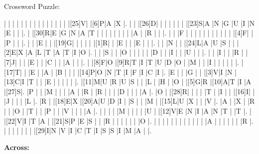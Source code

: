 \documentclass[12pt]{article}
\begin{document}
\begin{center}
  \huge{Crossword Puzzle:}
\end{center}
\vspace{1.5cm}
\begin{Puzzle}{21}{21}
  |{}  |{}  |{}  |{}  |{}  |{}  |{}  |{}  |{}  |{}  |{}  |{}  |{}  |{}  |{}  |[25]V|{}  |[6]P|A   |X   |.
  |{}  |{}  |[26]D|{}  |{}  |{}  |{}  |{}  |{}  |{}  |[23]S|A   |N   |G   |U   |I   |N   |E   |{}  |{}  |.
  |{}  |[30]R|E   |G   |N   |A   |T   |{}  |{}  |{}  |{}  |{}  |{}  |{}  |{}  |A   |{}  |R   |{}  |{}  |.
  |{}  |{}  |F   |{}  |{}  |{}  |{}  |{}  |{}  |{}  |{}  |{}  |{}  |{}  |[4]F|{}  |{}  |P   |{}  |{}  |.
  |{}  |{}  |E   |{}  |{}  |[19]G|{}  |{}  |{}  |{}  |{}  |[1]R|{}  |{}  |E   |{}  |{}  |E   |{}  |{}  |.
  |{}  |{}  |N   |{}  |{}  |[24]L|A   |U   |S   |{}  |{}  |[2]E|X   |A   |L   |T   |A   |T   |I   |O   |.
  |{}  |{}  |S   |{}  |{}  |O   |{}  |{}  |{}  |{}  |{}  |D   |{}  |{}  |I   |{}  |{}  |U   |{}  |{}  |.
  |{}  |{}  |I   |{}  |{}  |R   |{}  |[7]J|{}  |{}  |{}  |E   |{}  |{}  |C   |{}  |{}  |A   |{}  |{}  |.
  |{}  |[8]F|O   |[9]R|T   |I   |T   |U   |D   |O   |{}  |M   |{}  |{}  |I   |{}  |{}  |{}  |{}  |{}  |.
  |[17]T|{}  |{}  |E   |{}  |A   |{}  |B   |{}  |{}  |{}  |[14]P|O   |N   |T   |I   |F   |I   |C   |I   |.
  |E   |{}  |{}  |G   |{}  |{}  |[3]V|I   |N   |[13]C|I   |T   |{}  |{}  |E   |{}  |{}  |{}  |{}  |{}  |.
  |[11]M|U   |R   |U   |S   |{}  |{}  |L   |{}  |H   |{}  |O   |{}  |[5]G|R   |[10]A|T   |I   |A   |[27]S|.
  |P   |{}  |{}  |M   |{}  |{}  |{}  |A   |{}  |R   |{}  |R   |{}  |{}  |{}  |D   |{}  |{}  |{}  |A   |.
  |O   |{}  |[28]R|{}  |{}  |{}  |{}  |T   |{}  |I   |{}  |{}  |[16]I|{}  |{}  |J   |{}  |{}  |{}  |L   |.
  |R   |{}  |[18]E|X   |[20]A|U   |D   |I   |{}  |S   |{}  |{}  |M   |{}  |[15]L|U   |X   |{}  |{}  |V   |.
  |A   |{}  |X   |{}  |R   |{}  |{}  |O   |{}  |T   |{}  |{}  |P   |{}  |{}  |V   |{}  |{}  |{}  |A   |.
  |{}  |{}  |{}  |{}  |M   |{}  |{}  |{}  |{}  |U   |{}  |[12]V|E   |N   |I   |A   |N   |T   |{}  |T   |.
  |{}  |[22]V|I   |T   |A   |{}  |[21]S|P   |E   |S   |{}  |{}  |R   |{}  |{}  |{}  |{}  |{}  |{}  |O   |.
  |{}  |{}  |{}  |{}  |{}  |{}  |{}  |{}  |{}  |{}  |{}  |{}  |A   |{}  |{}  |{}  |{}  |{}  |{}  |R   |.
  |{}  |{}  |{}  |{}  |{}  |{}  |{}  |[29]I|N   |V   |I   |C   |T   |I   |S   |S   |I   |M   |A   |{}  |.
\end{Puzzle}
\begin{PuzzleClues}{\textbf{Across:}}
\end{PuzzleClues}
\end{document}

